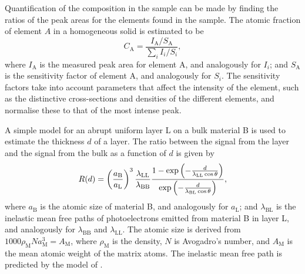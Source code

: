 Quantification of the composition in the sample can be made by finding the ratios of the peak areas for the elements found in the sample. The atomic fraction of element $A$ in a homogeneous solid is estimated to be \citep{moulder2000handbook}
\begin{equation}\label{eq:xps_concentration}
    C_\mathrm{A} = \frac{I_\mathrm{A}/S_\mathrm{A}}{\sum_i I_i/S_i},
\end{equation}
where $I_\mathrm{A}$ is the measured peak area for element A, and analogously for $I_i$; and $S_\mathrm{A}$ is the sensitivity factor of element A, and analogously for $S_i$. The sensitivity factors take into account parameters that affect the intensity of the element, such as the distinctive cross-sections and densities of the different elements, and normalise these to that of the most intense peak. %

A simple model for an abrupt uniform layer L on a bulk material B is used to estimate the thickness $d$ of a layer. The ratio between the signal from the layer and the signal from the bulk as a function of $d$ is given by \citep{briggs1990practical} 
\begin{equation}\label{eq:signal_ratio}
    R(d) = \left( \frac{a_\mathrm{B}}{a_\mathrm{L}} \right)^3 \frac{\lambda_\mathrm{LL}}{\lambda_\mathrm{BB}} \frac{1-\exp{\left( -\frac{d}{\lambda_\mathrm{LL}\cos\theta} \right)}}{\exp{\left( -\frac{d}{\lambda_\mathrm{BL}\cos\theta} \right)}},
\end{equation}
where $a_\mathrm{B}$ is the atomic size of material B, and analogously for $a_\mathrm{L}$; and $\lambda_\mathrm{BL}$ is the inelastic mean free paths of photoelectrons emitted from material B in layer L, and analogously for $\lambda_\mathrm{BB}$ and $\lambda_\mathrm{LL}$. The atomic size is derived from $1000\rho_\mathrm{M}N a_\mathrm{M}^3 = A_\mathrm{M}$, where $\rho_\mathrm{M}$ is the density, $N$ is Avogadro's number, and $A_\mathrm{M}$ is the mean atomic weight of the matrix atoms. The inelastic mean free path is predicted by the model of \citet{tanuma1991calculations}.


